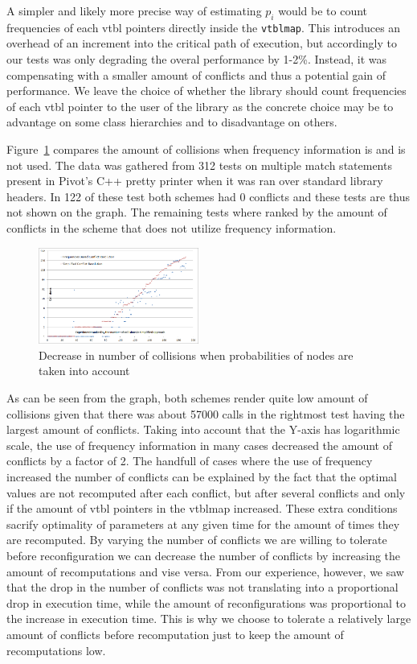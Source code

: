 \documentclass[preprint]{sigplanconf}
\makeatletter
\DeclareRobustCommand{\code}[1]{{\lstinline[breaklines=false,escapechar=@]{#1}}}
\makeatother
\begin{document}
A simpler and likely more precise way of estimating $p_i$ would be to count 
frequencies of each vtbl pointers directly inside the \code{vtblmap}. This 
introduces an overhead of an increment into the critical path of execution, but 
accordingly to our tests was only degrading the overal performance by 1-2\%.
Instead, it was compensating with a smaller amount of conflicts and thus a 
potential gain of performance. We leave the choice of whether the library should 
count frequencies of each vtbl pointer to the user of the library as the 
concrete choice may be to advantage on some class hierarchies and to 
disadvantage on others.

Figure~\ref{fig:Collisions} compares the amount of collisions when frequency 
information is and is not used. The data was gathered from 312 tests on multiple 
match statements present in Pivot's C++ pretty printer when it was ran over 
standard library headers. In 122 of these test both schemes had 0 conflicts and 
these tests are thus not shown on the graph. The remaining tests where ranked by 
the amount of conflicts in the scheme that does not utilize frequency information.

\begin{figure}[htbp]
  \centering
    \includegraphics[width=0.47\textwidth]{CollisionsWithAndWithoutFrequencies.png}
  \caption{Decrease in number of collisions when probabilities of nodes are taken into account}
  \label{fig:Collisions}
\end{figure}

As can be seen from the graph, both schemes render quite low amount of 
collisions given that there was about 57000 calls in the rightmost test having 
the largest amount of conflicts. Taking into account that the Y-axis has 
logarithmic scale, the use of frequency information in many cases decreased the 
amount of conflicts by a factor of 2. The handfull of cases where the use of 
frequency increased the number of conflicts can be explained by the fact that 
the optimal values are not recomputed after each conflict, but after several 
conflicts and only if the amount of vtbl pointers in the vtblmap increased. These 
extra conditions sacrify optimality of parameters at any given time for the amount 
of times they are recomputed. By varying the number of conflicts we are willing 
to tolerate before reconfiguration we can decrease the number of conflicts by 
increasing the amount of recomputations and vise versa. From our experience, 
however, we saw that the drop in the number of conflicts was not translating 
into a proportional drop in execution time, while the amount of reconfigurations 
was proportional to the increase in execution time. This is why we choose to 
tolerate a relatively large amount of conflicts before recomputation just to 
keep the amount of recomputations low.
\end{document}
